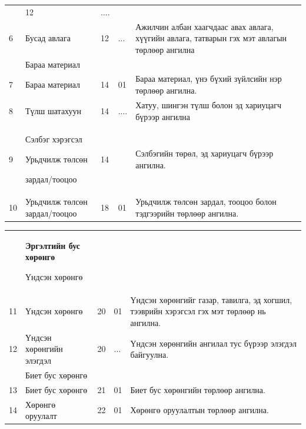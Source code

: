 {{{{{\begin{tabular}{ |p{0.5cm}||p{5cm}|p{1cm}|p{1cm}|p{4.8cm} | }
	
	& 12   &.... & \\
	6 &Бусад авлага & 12&  ... &Ажилчин албан хаагчдаас авах авлага, хүүгийн авлага, татварын гэх мэт авлагын төрлөөр ангилна\\
	
	
	\hline
	
	\hline
	
	&          Бараа материал
	& &  & \\
	7  &Бараа материал   &14&   01 &Бараа материал, үнэ бүхий зүйлсийн нэр төрлөөр ангилна.\\
	8& Түлш шатахуун
	
	
	& 14   &.... &Хатуу, шингэн түлш болон эд хариуцагч бүрээр ангилна \\
	9 &Сэлбэг хэрэгсэл
	
	Урьдчилж төлсөн
	
	зардал/тооцоо
	& 14&   &Сэлбэгийн төрөл, эд хариуцагч бүрээр ангилна. \\
	
	10 &Урьдчилж төлсөн зардал/тооцоо
	
	& 18&  01 &Урьдчилж төлсөн зардал, тооцоо болон тэдгээрийн төрлөөр ангилна.\\
	\hline
\end{tabular}


\begin{tabular}{ |p{0.5cm}||p{5cm}|p{1cm}|p{1cm}|p{4.2cm} | }
	
	\hline
	&          
	\textbf{Эргэлтийн бус хөрөнгө}
	
	Үндсэн хөрөнгө
	
	& &  & \\
	11   & Үндсэн хөрөнгө     &20&   01 &Үндсэн хөрөнгийг газар, тавилга, эд хогшил, тээврийн хэрэгсэл гэх мэт төрлөөр нь ангилна.\\
	12&  Үндсэн хөрөнгийн элэгдэл
	
	
	& 20   &... & Үндсэн хөрөнгийн ангилал тус бүрээр элэгдэл байгуулна.\\
	
	
	
	\hline
	
	\hline
	
	&          Биет бус хөрөнгө
	
	
	& &  & \\
	13  &	Биет бус хөрөнгө   &21&   01 &Биет бус хөрөнгийн төрлөөр ангилна.\\
	14&  Хөрөнгө оруулалт
	
	
	& 22   &01 &Хөрөнгө оруулалтын төрлөөр ангилна. \\
	

\end{tabular}}}}}}
